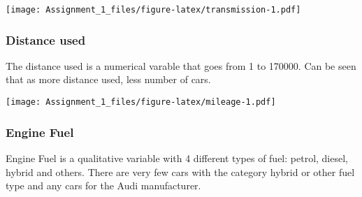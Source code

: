 \documentclass[
]{article}
\newenvironment{Shaded}{\begin{snugshade}}{\end{snugshade}}
\newcommand{\AttributeTok}[1]{\textcolor[rgb]{0.77,0.63,0.00}{#1}}
\newcommand{\CommentTok}[1]{\textcolor[rgb]{0.56,0.35,0.01}{\textit{#1}}}
\newcommand{\DecValTok}[1]{\textcolor[rgb]{0.00,0.00,0.81}{#1}}
\newcommand{\FunctionTok}[1]{\textcolor[rgb]{0.00,0.00,0.00}{#1}}
\newcommand{\NormalTok}[1]{#1}
\newcommand{\SpecialCharTok}[1]{\textcolor[rgb]{0.00,0.00,0.00}{#1}}
\newcommand{\StringTok}[1]{\textcolor[rgb]{0.31,0.60,0.02}{#1}}
\begin{document}
\texttt{[image: Assignment\_1\_files/figure-latex/transmission-1.pdf]}

\newpage

\hypertarget{distance-used}{%
\subsubsection{Distance used}\label{distance-used}}

The distance used is a numerical varable that goes from 1 to 170000. Can
be seen that as more distance used, less number of cars.

\begin{Shaded}
\end{Shaded}

\texttt{[image: Assignment\_1\_files/figure-latex/mileage-1.pdf]}

\newpage

\hypertarget{engine-fuel}{%
\subsubsection{Engine Fuel}\label{engine-fuel}}

Engine Fuel is a qualitative variable with 4 different types of fuel:
petrol, diesel, hybrid and others. There are very few cars with the
category hybrid or other fuel type and any cars for the Audi
manufacturer.
\end{document}
